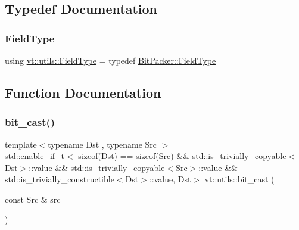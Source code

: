 \subsection{Typedef Documentation}
\mbox{\label{namespacevt_1_1utils_a83bf4339dd1250f9880b6d4603320d39}} 
\subsubsection{\texorpdfstring{Field\+Type}{FieldType}}
{\footnotesize\ttfamily using \hyperlink{namespacevt_1_1utils_a83bf4339dd1250f9880b6d4603320d39}{vt\+::utils\+::\+Field\+Type} = typedef \hyperlink{structvt_1_1utils_1_1_bit_packer_a23024285425933c1f10c8fc3942f9beb}{Bit\+Packer\+::\+Field\+Type}}



\subsection{Function Documentation}
\mbox{\label{namespacevt_1_1utils_a5aec27f45ff5fd0bacb4b589a100e5be}} 
\subsubsection{\texorpdfstring{bit\+\_\+cast()}{bit\_cast()}}
{\footnotesize\ttfamily template$<$typename Dst , typename Src $>$ \\
std\+::enable\+\_\+if\+\_\+t$<$ sizeof(Dst) == sizeof(Src) \&\& std\+::is\+\_\+trivially\+\_\+copyable$<$Dst$>$\+::value \&\& std\+::is\+\_\+trivially\+\_\+copyable$<$Src$>$\+::value \&\& std\+::is\+\_\+trivially\+\_\+constructible$<$Dst$>$\+::value, Dst$>$ vt\+::utils\+::bit\+\_\+cast (\begin{DoxyParamCaption}\item[{const Src \&}]{src }\end{DoxyParamCaption})}

